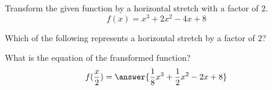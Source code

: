 \documentclass{ximera}
\author{Ivo Terek}
\begin{document}
Transform the given function by a horizontal stretch with a factor of $2$.
\[
f(x)=x^3+2x^2-4x+8
\]
\begin{exercise}
Which of the following represents a horizontal stretch by a factor of $2$?
\begin{multipleChoice}
\end{multipleChoice}
\end{exercise}
\begin{exercise}
What is the equation of the fransformed function?
\[
f(\frac{x}{2})=\answer{\frac{1}{8}x^3+\frac{1}{2}x^2-2x+8}
\]
\end{exercise}
\end{document}
